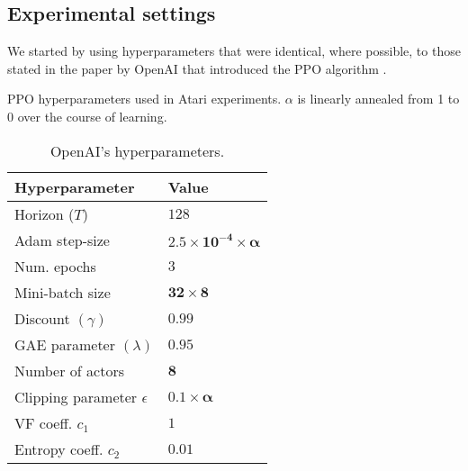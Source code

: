 \documentclass[12pt,a4paper]{article}
\begin{document}
\subsection{Experimental settings}
We started by using hyperparameters that were identical, where possible, to those stated in the paper by OpenAI that introduced the PPO algorithm \cite{DBLP:journals/corr/SchulmanWDRK17}. 

\begin{table}[ht]
    \caption{PPO hyperparameters used in Atari experiments. $\alpha$ is linearly annealed from 1 to 0 over the course of learning.}
    \label{tab:temps}
    \begin{subtable}[ht]{0.45\textwidth}
        \centering
        \caption{OpenAI's hyperparameters.}
        \label{tab:openai-param}    
        \begin{tabular}{ l|l } 
            Hyperparameter                & Value \\
            \hline 
            Horizon ($T$)                   & $128$ \\ 
            Adam step-size                 & $\mathbf{2.5 \times 10^{-4} \times \alpha}$ \\
            Num. epochs                   & $3$ \\
            Mini-batch size                & $\mathbf{32 \times 8}$ \\
            Discount $(\gamma)$           & $0.99$ \\
            GAE parameter $(\lambda)$     & $0.95$ \\
            Number of actors              & $\mathbf{8}$ \\
            Clipping parameter $\epsilon$ & $\mathbf{0.1 \times \alpha}$ \\
            VF coeff. $c_1$               & $1$ \\
            Entropy coeff. $c_2$          & $\mathbf{0.01}$
        \end{tabular}
       

\end{subtable}
\end{table}
\end{document}
